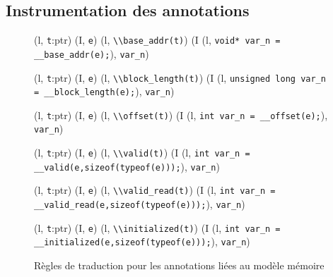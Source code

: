 \subsection{Instrumentation des annotations}


\begin{figure*}[bt]
  \scriptsize{
    {
      {(l, \mbox{\lstinline't'}:ptr)  (I, \mbox{\lstinline'e'}) }
      {(l, \mbox{\lstinline'\\base_addr(t)'}) 
        (I \concat
        (l, \mbox{\lstinline'void* var_n = __base_addr(e);'}),
        \mbox{\lstinline'var_n'})
      }{}
    }

    {
      {(l, \mbox{\lstinline't'}:ptr)  (I, \mbox{\lstinline'e'}) }
      {(l, \mbox{\lstinline'\\block_length(t)'}) 
        (I \concat
        (l, \mbox{\lstinline'unsigned long var_n = __block_length(e);'}),
        \mbox{\lstinline'var_n'})
      }{}
    }

    {
      {(l, \mbox{\lstinline't'}:ptr)  (I, \mbox{\lstinline'e'}) }
      {(l, \mbox{\lstinline'\\offset(t)'}) 
        (I \concat
        (l, \mbox{\lstinline'int var_n = __offset(e);'}),
        \mbox{\lstinline'var_n'})
      }{}
    }

    {
      {(l, \mbox{\lstinline't'}:ptr)  (I, \mbox{\lstinline'e'}) }
      {(l, \mbox{\lstinline'\\valid(t)'}) 
        (I \concat
        (l, \mbox{\lstinline'int var_n = __valid(e,sizeof(typeof(e)));'}),
        \mbox{\lstinline'var_n'})
      }{}
    }

    {
      {(l, \mbox{\lstinline't'}:ptr)  (I, \mbox{\lstinline'e'}) }
      {(l, \mbox{\lstinline'\\valid_read(t)'}) 
        (I \concat
        (l, \mbox{\lstinline'int var_n = __valid_read(e,sizeof(typeof(e)));'}),
        \mbox{\lstinline'var_n'})
      }{}
    }

    {
      {(l, \mbox{\lstinline't'}:ptr)  (I, \mbox{\lstinline'e'}) }
      {(l, \mbox{\lstinline'\\initialized(t)'}) 
        (I \concat
        (l, \mbox{\lstinline'int var_n = __initialized(e,sizeof(typeof(e)));'}),
        \mbox{\lstinline'var_n'})
      }{}
    }
  }
  \caption{Règles de traduction pour les annotations liées au modèle mémoire}
  \label{fig:mem-annots-rules}
\end{figure*}


